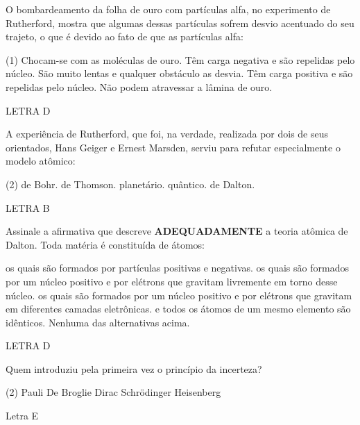 \documentclass[9 pt]{scrartcl}
\def\PQ{0.84} %
\begin{document}
\begin{exercise}[points=\PQ]
O bombardeamento da folha de ouro com partículas alfa, no experimento de Rutherford, mostra que algumas dessas partículas sofrem desvio acentuado do seu trajeto, o que é devido ao fato de que as partículas alfa:
\begin{choice}(1)
\choice Chocam-se com as moléculas de ouro.
\choice Têm carga negativa e são repelidas pelo núcleo.
\choice São muito lentas e qualquer obstáculo as desvia.
\choice Têm carga positiva e são repelidas pelo núcleo.
\choice Não podem atravessar a lâmina de ouro.
\end{choice}
\end{exercise}
\begin{solution}
LETRA D
\end{solution}



\begin{exercise}[points=\PQ]
A experiência de Rutherford, que foi, na verdade, realizada por dois de seus orientados, Hans Geiger e Ernest Marsden, serviu para refutar especialmente o modelo atômico:
\begin{choice}(2)
\choice de Bohr.
\choice de Thomson.
\choice planetário.
\choice quântico.
\choice de Dalton.
\end{choice}
\end{exercise}
\begin{solution}
LETRA B
\end{solution}

\begin{exercise}[points=\PQ]
Assinale a afirmativa que descreve \textbf{ADEQUADAMENTE} a teoria atômica de Dalton. Toda matéria é constituída de átomos:
\begin{choice}
\choice os quais são formados por partículas positivas e negativas.
\choice os quais são formados por um núcleo positivo e por elétrons que gravitam livremente em torno desse núcleo.
\choice os quais são formados por um núcleo positivo e por elétrons que gravitam em diferentes camadas eletrônicas.
\choice e todos os átomos de um mesmo elemento são idênticos.
\choice Nenhuma das alternativas acima.
\end{choice}
\end{exercise}
\begin{solution}
LETRA D
\end{solution}



\begin{exercise}[points=\PQ]
Quem introduziu pela primeira vez o princípio da incerteza?

\begin{choice}(2)
\choice Pauli
\choice De Broglie
\choice Dirac
\choice Schrödinger
\choice Heisenberg
\end{choice}
\end{exercise}
\begin{solution}
Letra E
\end{solution}
\end{document}
